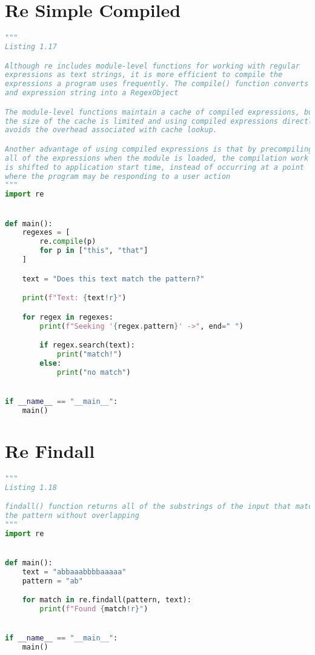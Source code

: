 \documentclass[a4paper,landscape]{report}
\begin{document}
\section{Re Simple Compiled}
\begin{lstlisting}[language=Python]
"""
Listing 1.17

Although re includes module-level functions for working with regular
expressions as text strings, it is more efficient to compile the
expressions a program uses frequently. The compile() function converts
and expression string into a RegexObject

The module-level functions maintain a cache of compiled expressions, but
the size of the cache is limited and using compiled expressions directly
avoids the overhead associated with cache lookup.

Another advantage of using compiled expressions is that by precompiling
all of the expressions when the module is loaded, the compilation work
is shifted to application start time, instead of occurring at a point
where the program may be responding to a user action
"""
import re


def main():
    regexes = [
        re.compile(p)
        for p in ["this", "that"]
    ]

    text = "Does this text match the pattern?"

    print(f"Text: {text!r}")

    for regex in regexes:
        print(f"Seeking '{regex.pattern}' ->", end=" ")

        if regex.search(text):
            print("match!")
        else:
            print("no match")


if __name__ == "__main__":
    main()

\end{lstlisting}
\section{Re Findall}
\begin{lstlisting}[language=Python]
"""
Listing 1.18

findall() function returns all of the substrings of the input that match
the pattern without overlapping
"""
import re


def main():
    text = "abbaaabbbbaaaaa"
    pattern = "ab"

    for match in re.findall(pattern, text):
        print(f"Found {match!r}")


if __name__ == "__main__":
    main()

\end{lstlisting}
\end{document}
